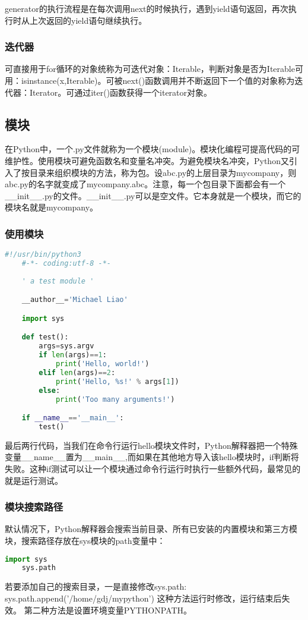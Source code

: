 \documentclass[12pt,a4paper]{article}
\begin{document}
\begin{CJK}{UTF8}{gbsn}
    generator的执行流程是在每次调用next的时候执行，遇到yield语句返回，再次执行时从上次返回的yield语句继续执行。
    \subsubsection{迭代器}
    可直接用于for循环的对象统称为可迭代对象：Iterable，判断对象是否为Iterable可用：isinstance(x,Iterable)。可被next()函数调用并不断返回下一个值的对象称为迭代器：Iterator。可通过iter()函数获得一个iterator对象。
    \subsection{模块}
    在Python中，一个.py文件就称为一个模块(module)。模块化编程可提高代码的可维护性。使用模块可避免函数名和变量名冲突。为避免模块名冲突，Python又引入了按目录来组织模块的方法，称为包。设abc.py的上层目录为mycompany，则abc.py的名字就变成了mycompany.abc。注意，每一个包目录下面都会有一个\_\_init\_\_.py的文件。\_\_init\_\_.py可以是空文件。它本身就是一个模块，而它的模块名就是mycompany。
    \subsubsection{使用模块}
    \begin{lstlisting}[language=Python]
    #!/usr/bin/python3
    #-*- coding:utf-8 -*-
    
    ' a test module '

    __author__='Michael Liao'

    import sys

    def test():
        args=sys.argv
        if len(args)==1:
            print('Hello, world!')
        elif len(args)==2:
            print('Hello, %s!' % args[1])
        else:
            print('Too many arguments!')

    if __name__=='__main__':
        test()
    \end{lstlisting}
    最后两行代码，当我们在命令行运行hello模块文件时，Python解释器把一个特殊变量\_\_name\_\_置为\_\_main\_\_,而如果在其他地方导入该hello模块时，if判断将失败。这种if测试可以让一个模块通过命令行运行时执行一些额外代码，最常见的就是运行测试。
    \subsubsection{模块搜索路径}
    默认情况下，Python解释器会搜索当前目录、所有已安装的内置模块和第三方模块，搜索路径存放在sys模块的path变量中：
    \begin{lstlisting}[language=python]
    import sys
    sys.path
    \end{lstlisting}
    若要添加自己的搜索目录，一是直接修改sys.path:
    sys.path.append('/home/gdj/mypython')
    这种方法运行时修改，运行结束后失效。
    第二种方法是设置环境变量PYTHONPATH。

\end{CJK}
\end{document}
